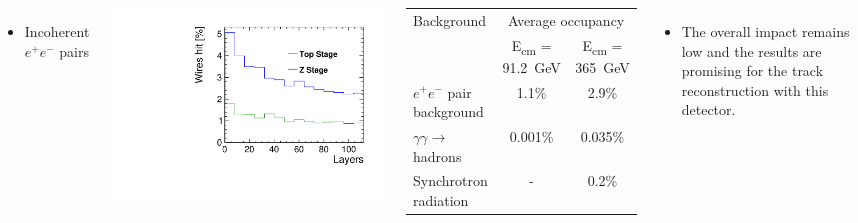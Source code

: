 \documentclass[final,xcolor={dvipsnames,svgnames,x11names,table}]{beamer}
\begin{document}
\begin{frame}
\begin{textblock}{80}
\begin{tcolorbox}[title=Main sources of beam-induced backgrounds at the FCC-ee and the impact on the IDEA drift chamber]
\begin{columns}
    \begin{itemize}
      \item Incoherent $e^+e^-$ pairs
    \end{itemize}
    \centering
    \includegraphics[width=\textwidth]{Figures/incoherent_top_Z.pdf}

    \begin{adjustbox}{max width=\textwidth}
      \begin{tabular}{l c c}
        \toprule
         Background & \multicolumn{2}{c}{Average occupancy} \\
          & E\textsubscript{cm} = 91.2~GeV &  E\textsubscript{cm} = 365~GeV \\
         \midrule
         $e^+e^-$ pair background & 1.1\% & 2.9\% \\
         $\gamma\gamma\rightarrow$ hadrons & 0.001\% & 0.035\%  \\
         Synchrotron radiation & - & 0.2\% \\
         \bottomrule
      \end{tabular}
    \end{adjustbox}

    \begin{itemize}
      \item The overall impact remains low and the results are promising for the track reconstruction with this detector.
    \end{itemize}

  \end{columns}

  \end{tcolorbox}
\end{textblock}



\end{frame}
\end{document}
